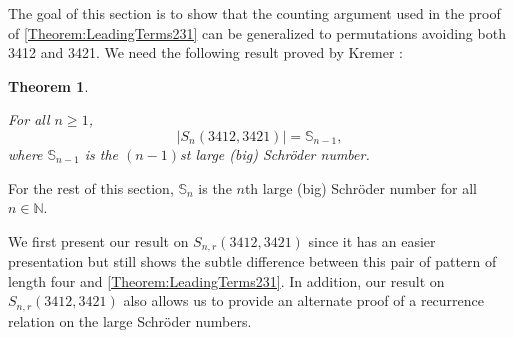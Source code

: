 \documentclass[11pt]{article}
\newtheorem{theorem}{Theorem}[section]
\theoremstyle{definition}
\numberwithin{equation}{section}
\begin{document}
The goal of this section is to show that the counting argument used in the 
proof of \cref{Theorem:LeadingTerms231} can be generalized to permutations avoiding both 3412 and 3421. We need the following result proved by Kremer \cite[Corollary 9]{Kremer2000}:
\begin{theorem}\label{Theorem:34123421}

For all $n\geq1$,
\[
|S_n(3412,3421)|=\mathbb{S}_{n-1},
\]
where $\mathbb{S}_{n-1}$ is the $(n-1)$st large (big) Schr\"{o}der number.
\end{theorem}

For the rest of this section, $\mathbb{S}_n$ is the $n$th large (big) Schr\"{o}der number for all $n\in\mathbb{N}$.

We first present our result on $S_{n,r}(3412,3421)$ since it has an easier presentation but still shows the subtle difference between this pair of pattern of length four and \cref{Theorem:LeadingTerms231}. In addition, our result on $S_{n,r}(3412,3421)$ also allows us to provide an alternate proof of a recurrence relation on the large Schr\"{o}der numbers.
\end{document}
